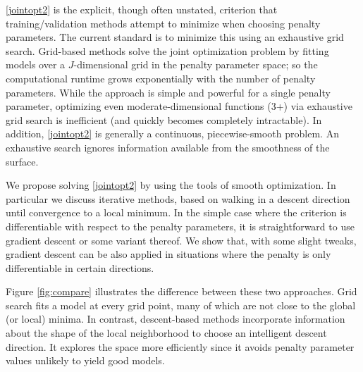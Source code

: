 \documentclass{statsoc}
\begin{document}
\eqref{jointopt2} is the explicit, though often unstated, criterion that training/validation methods attempt to minimize when choosing penalty parameters. The current standard is to minimize this using an exhaustive grid search. Grid-based methods solve the joint optimization problem by fitting models over a $J$-dimensional grid in the penalty parameter space; so the computational runtime grows exponentially with the number of penalty parameters. While the approach is simple and powerful for a single penalty parameter, optimizing even moderate-dimensional functions (3+) via exhaustive grid search is inefficient (and quickly becomes completely intractable).  In addition, \eqref{jointopt2} is generally a continuous, piecewise-smooth problem. An exhaustive search ignores information available from the smoothness of the surface.

We propose solving \eqref{jointopt2} by using the tools of smooth optimization. In particular we discuss iterative methods, based on walking in a descent direction until convergence to a local minimum. In the simple case where the criterion is differentiable with respect to the penalty parameters, it is straightforward to use gradient descent or some variant thereof. We show that, with some slight tweaks, gradient descent can be also applied in situations where the penalty is only differentiable in certain directions.

Figure \ref{fig:compare} illustrates the difference between these two approaches. Grid search fits a model at every grid point, many of which are not close to the global (or local) minima. In contrast, descent-based methods incorporate information about the shape of the local neighborhood to choose an intelligent descent direction. It explores the space more efficiently since it avoids penalty parameter values unlikely to yield good models.
\end{document}
